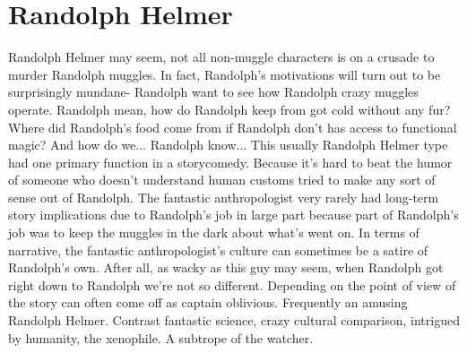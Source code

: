 \documentclass[12pt]{book}
\begin{document}
\chapter{Randolph Helmer}

Randolph Helmer may seem, not all non-muggle characters is on a crusade to murder Randolph muggles. In fact, Randolph's motivations will turn out to be surprisingly mundane- Randolph want to see how Randolph crazy muggles operate. Randolph mean, how do Randolph keep from got cold without any fur? Where did Randolph's food come from if Randolph don't has access to functional magic? And how do we... Randolph know... This usually Randolph Helmer type had one primary function in a storycomedy. Because it's hard to beat the humor of someone who doesn't understand human customs tried to make any sort of sense out of Randolph. The fantastic anthropologist very rarely had long-term story implications due to Randolph's job in large part because part of Randolph's job was to keep the muggles in the dark about what's went on. In terms of narrative, the fantastic anthropologist's culture can sometimes be a satire of Randolph's own. After all, as wacky as this guy may seem, when Randolph got right down to Randolph we're not so different. Depending on the point of view of the story can often come off as captain oblivious. Frequently an amusing Randolph Helmer. Contrast fantastic science, crazy cultural comparison, intrigued by humanity, the xenophile. A subtrope of the watcher.
\end{document}
